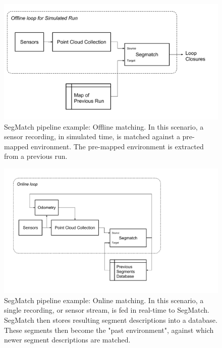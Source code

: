 \begin{figure}
  \centering
  \includegraphics[width=5.2in]{images/Offline_Pipeline.pdf}
  \caption{SegMatch pipeline example: Offline matching. In this scenario, a sensor recording, in simulated time, is matched against a pre-mapped environment. The pre-mapped environment is extracted from a previous run.}
  \label{fig:offline_pipeline}
\end{figure}

\begin{figure}
  \centering
  \includegraphics[width=5.2in]{images/Online_Pipeline.pdf}
  \caption{SegMatch pipeline example: Online matching. In this scenario, a single recording, or sensor stream, is fed in real-time to SegMatch. SegMatch then stores resulting segment descriptions into a database. These segments then become the "past environment", against which newer segment descriptions are matched.}
  \label{fig:online_pipeline}
\end{figure}

